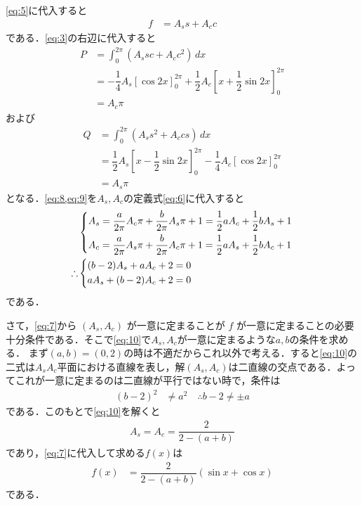\documentclass[../../main.tex]{subfiles}
\begin{document}
\cref{eq:5}に代入すると
\begin{align}
  f &= A_{s} s + A_{c} c \label{eq:7}
\end{align}
である．\cref{eq:3}の右辺に代入すると
\begin{align}
  P
  &= \int_0^{2\pi} (A_{s} sc + A_{c} c^2) \, dx \\
  &= -\dfrac{1}{4} A_{s} \left[ \cos 2x \right]_0^{2\pi} + \dfrac{1}{2} A_{c} \left[ x + \dfrac{1}{2}\sin 2x \right]_0^{2\pi} \\
  &= A_{c} \pi \label{eq:8}
\end{align}
および
\begin{align}
  Q
  &= \int_0^{2\pi} (A_{s} s^2 + A_{c} cs) \, dx \\
  &= \dfrac{1}{2} A_{s} \left[ x - \dfrac{1}{2}\sin 2x \right]_0^{2\pi} - \dfrac{1}{4} A_{c} \left[ \cos 2x \right]_0^{2\pi} \\
  &= A_{s} \pi \label{eq:9}
\end{align}
となる．\cref{eq:8,eq:9}を$A_{s},A_{c}$の定義式\cref{eq:6}に代入すると
\begin{align}
  &
  \begin{dcases}
    A_{s} = \dfrac{a}{2\pi} A_{c} \pi + \dfrac{b}{2\pi} A_{s} \pi + 1 = \dfrac{1}{2} a A_{c} + \dfrac{1}{2} b A_{s} + 1 \\
    A_{c} = \dfrac{a}{2\pi} A_{s} \pi + \dfrac{b}{2\pi} A_{c} \pi + 1 = \dfrac{1}{2} a A_{s} + \dfrac{1}{2} b A_{c} + 1
  \end{dcases} \\
  \therefore
  &
  \begin{dcases}
    (b-2)A_{s} + aA_{c} + 2 = 0 \\
    aA_{s} + (b-2)A_{c} + 2 = 0
  \end{dcases} \label{eq:10}
\end{align}
である．

さて，\cref{eq:7}から $(A_{s},A_{c})$ が一意に定まることが $f$ が一意に定まることの必要十分条件である．そこで\cref{eq:10}で$A_{s},A_{c}$が一意に定まるような$a,b$の条件を求める．
まず$(a,b)=(0,2)$の時は不適だからこれ以外で考える．すると\cref{eq:10}の二式は$A_{s}A_{c}$平面における直線を表し，解$(A_{s},A_{c})$は二直線の交点である．よってこれが一意に定まるのは二直線が平行ではない時で，条件は
\begin{align}
  (b-2)^2 &\neq a^2 \quad \therefore b-2 \neq \pm a \label{eq:11}
\end{align}
である．このもとで\cref{eq:10}を解くと
\begin{align}
  A_{s} = A_{c} = \dfrac{2}{2-(a+b)} \label{eq:12}
\end{align}
であり，\cref{eq:7}に代入して求める$f(x)$は
\begin{align}
  f(x) &= \dfrac{2}{2-(a+b)} (\sin x + \cos x)
\end{align}
である．
\end{document}
